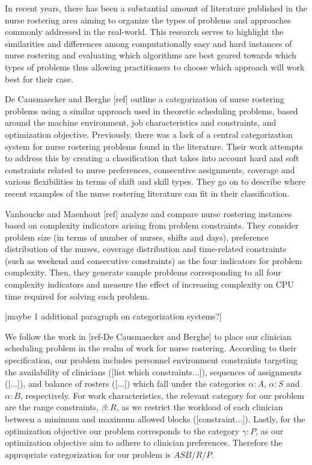 In recent years, there has been a substantial amount of literature published in
the nurse rostering area aiming to organize the types of problems and approaches
commonly
addressed in the real-world. This research serves to highlight the similarities
and differences
among computationally easy and hard instances of nurse rostering and evaluating
which algorithms
are best geared towards which types of problems thus allowing practitioners
to choose which approach will work best for their case.

De Causmaecker and Berghe [ref] outline a categorization
of nurse rostering problems using a similar approach used in theoretic scheduling problems,
based around the machine environment, job characteristics and constraints,
and optimization objective. Previously, there was a lack of a central categorization system
for nurse rostering problems found in the literature. Their work attempts
to address this by creating a classification that takes into account
hard and soft constraints related to nurse preferences, consecutive 
assignments, coverage and various flexibilities in terms of shift and
skill types. They go on to describe where recent examples of the nurse rostering
literature can fit in their classification.

Vanhoucke and Maenhout [ref] analyze and compare nurse rostering instances
based on complexity indicators arising from problem constraints. They consider
problem size (in terms of number of nurses, shifts and days), preference distribution
of the nurses, coverage distribution and time-related constraints (such as weekend
and consecutive constraints) as the four indicators for problem complexity.
Then, they generate sample problems corresponding to all four complexity indicators
and measure the effect of increasing complexity on CPU time required for solving each
problem. 

[maybe 1 additional paragraph on categorization systems?]

We follow the work in [ref-De Causmaecker and Berghe] to place our clinician
scheduling problem in the realm of work for nurse rostering. 
According to their specification, our problem includes 
personnel environment constraints targeting the availability of clinicians
([list which constraints...]),
sequences of assignments ([...]), and balance of rosters ([...]) 
which fall under the categories $\alpha : A$, $\alpha : S$ and $\alpha : B$,
respectively. 
For work characteristics, the relevant category for our problem are the range
constraints, $\beta : R$, 
as we restrict the workload of each clinician between a minimum and maximum
allowed blocks ([constraint...]).
Lastly, for the optimization objective our problem corresponds to the category
$\gamma : P$, as our optimization objective
aim to adhere to clinician preferences. Therefore the appropriate categorization
for our problem is $ASB/R/P$.

